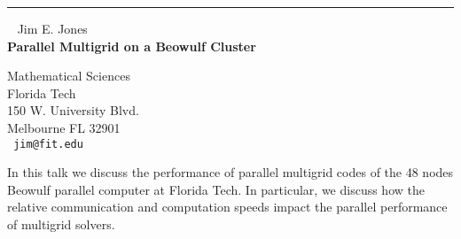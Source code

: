 \documentclass{report}
\begin{document}
\begin{center}

\rule{6in}{1pt} \
{\large
Jim E. Jones
\\ {\bf
Parallel Multigrid on a Beowulf Cluster
}}

Mathematical Sciences \\
Florida Tech \\
150 W. University Blvd. \\
Melbourne FL 32901 
\\ {\tt
jim@fit.edu
}

\end{center}

In this talk we discuss the performance of parallel multigrid codes of
the 48 nodes Beowulf parallel computer at Florida Tech. In particular,
we discuss how the relative communication and computation speeds impact
the parallel performance of multigrid solvers.
\end{document}
